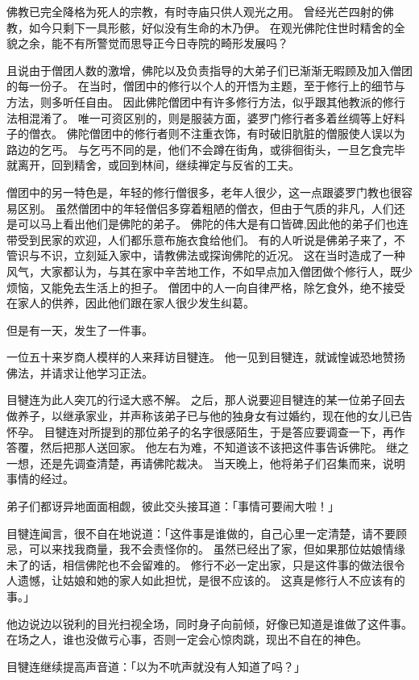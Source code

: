 \documentclass[twoside,openany]{book}
\begin{document}
佛教已完全降格为死人的宗教，有时寺庙只供人观光之用。
曾经光芒四射的佛教，如今只剩下一具形骸，好似没有生命的木乃伊。
在观光佛陀住世时精舍的全貌之余，能不有所警觉而思导正今日寺院的畸形发展吗？

且说由于僧团人数的激增，佛陀以及负责指导的大弟子们已渐渐无暇顾及加入僧团的每一份子。
在当时，僧团中的修行以个人的开悟为主题，至于修行上的细节与方法，则多听任自由。
因此佛陀僧团中有许多修行方法，似乎跟其他教派的修行法相混淆了。
唯一可资区别的，则是服装方面，婆罗门修行者多着丝绸等上好料子的僧衣。
佛陀僧团中的修行者则不注重衣饰，有时破旧肮脏的僧服使人误以为路边的乞丐。
与乞丐不同的是，他们不会蹲在街角，或徘徊街头，一旦乞食完毕就离开，回到精舍，或回到林间，继续禅定与反省的工夫。

僧团中的另一特色是，年轻的修行僧很多，老年人很少，这一点跟婆罗门教也很容易区别。
虽然僧团中的年轻僧侣多穿着粗陋的僧衣，但由于气质的非凡，人们还是可以马上看出他们是佛陀的弟子。
佛陀的伟大是有口皆碑,因此他的弟子们也连带受到民家的欢迎，人们都乐意布施衣食给他们。
有的人听说是佛弟子来了，不管识与不识，立刻延入家中，请教佛法或探询佛陀的近况。
这在当时造成了一种风气，大家都认为，与其在家中辛苦地工作，不如早点加入僧团做个修行人，既少烦恼，又能免去生活上的担子。
僧团中的人一向自律严格，除乞食外，绝不接受在家人的供养，因此他们跟在家人很少发生纠葛。

但是有一天，发生了一件事。

一位五十来岁商人模样的人来拜访目犍连。
他一见到目犍连，就诚惶诚恐地赞扬佛法，并请求让他学习正法。

目犍连为此人突兀的行迳大惑不解。
之后，那人说要迎目犍连的某一位弟子回去做养子，以继承家业，并声称该弟子已与他的独身女有过婚约，现在他的女儿已告怀孕。
目犍连对所提到的那位弟子的名字很感陌生，于是答应要调查一下，再作答覆，然后把那人送回家。
他左右为难，不知道该不该把这件事告诉佛陀。
继之一想，还是先调查清楚，再请佛陀裁决。
当天晚上，他将弟子们召集而来，说明事情的经过。

弟子们都讶异地面面相觑，彼此交头接耳道：「事情可要闹大啦！」

目犍连闻言，很不自在地说道：「这件事是谁做的，自己心里一定清楚，请不要顾忌，可以来找我商量，我不会责怪你的。
虽然已经出了家，但如果那位姑娘情缘未了的话，相信佛陀也不会留难的。
修行不必一定出家，只是这件事的做法很令人遗憾，让姑娘和她的家人如此担忧，是很不应该的。
这真是修行人不应该有的事。」

他边说边以锐利的目光扫视全场，同时身子向前倾，好像已知道是谁做了这件事。
在场之人，谁也没做亏心事，否则一定会心惊肉跳，现出不自在的神色。

目犍连继续提高声音道：「以为不吭声就没有人知道了吗？」
\end{document}
